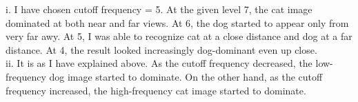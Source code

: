 i. I have chosen cutoff frequency = 5. At the given level 7, the cat image dominated at both near and far views. At 6, the dog started to appear only from very far awy. At 5, I was able to recognize cat at a close distance and dog at a far distance. At 4, the result looked increasingly dog-dominant even up close.\\
ii. It is as I have explained above. As the cutoff frequency decreased, the low-frequency dog image started to dominate. On the other hand, as the cutoff frequency increased, the high-frequency cat image started to dominate.